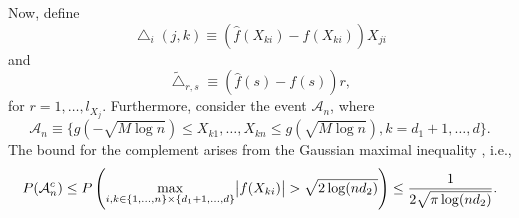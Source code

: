 Now, define
\begin{equation*}
    \bigtriangleup_i(j,k) \equiv (\hat{f}(X_{ki}) - f(X_{ki}))X_{ji}
\end{equation*}
and 
\begin{equation*}
    \tilde{\bigtriangleup}_{r,s} \equiv (\hat{f}(s) - f(s))r,
\end{equation*}    
for $r = 1, \dots, l_{X_j}$. Furthermore, consider the event $\mathcal{A}_n$, where
\begin{equation*}
    \mathcal{A}_n \equiv \{g(-\sqrt{M\log n}) \leq X_{k1}, \dots, X_{kn} \leq g(\sqrt{M\log n}), k = d_1 + 1, \dots, d\}.
\end{equation*}
The bound for the complement arises from the Gaussian maximal inequality \citep[Lemma 13]{Liu09}, i.e.,
\begin{equation*}
    P(\mathcal{A}_n^c) \leq P\left(\max_{i,k\in \{1,\dots,n\}\times\{d_1+1, \dots, d\}} \abs{f(X_{ki})} > \sqrt{2\log(nd_2)}\right) \leq \frac{1}{2\sqrt{\pi\log(nd_2)}}.
\end{equation*}

